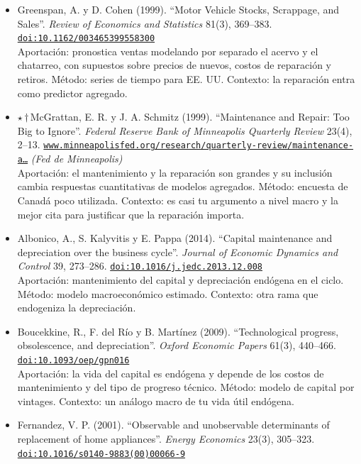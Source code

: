 \documentclass[11pt]{article}
\begin{document}
\begin{itemize}
Aportación: determinantes del chatarreo de autos. Método: series de tiempo agregadas. Contexto: precursor de Parks (1977); suele incluir el costo de reparación entre los determinantes, pero no pude confirmarlo en la fuente.
\item Greenspan, A. y D. Cohen (1999). ``Motor Vehicle Stocks, Scrappage, and Sales''. \textit{Review of Economics and Statistics} 81(3), 369--383. \href{https://doi.org/10.1162/003465399558300}{\texttt{doi:10.1162/003465399558300}}\\
Aportación: pronostica ventas modelando por separado el acervo y el chatarreo, con supuestos sobre precios de nuevos, costos de reparación y retiros. Método: series de tiempo para EE. UU. Contexto: la reparación entra como predictor agregado.
\item $\star$\,$\dagger$\,McGrattan, E. R. y J. A. Schmitz (1999). ``Maintenance and Repair: Too Big to Ignore''. \textit{Federal Reserve Bank of Minneapolis Quarterly Review} 23(4), 2--13. \href{https://www.minneapolisfed.org/research/quarterly-review/maintenance-and-repair-too-big-to-ignore}{\texttt{www.minneapolisfed.org/research/quarterly-review/maintenance-a…}} \textit{(Fed de Minneapolis)}\\
Aportación: el mantenimiento y la reparación son grandes y su inclusión cambia respuestas cuantitativas de modelos agregados. Método: encuesta de Canadá poco utilizada. Contexto: es casi tu argumento a nivel macro y la mejor cita para justificar que la reparación importa.
\item Albonico, A., S. Kalyvitis y E. Pappa (2014). ``Capital maintenance and depreciation over the business cycle''. \textit{Journal of Economic Dynamics and Control} 39, 273--286. \href{https://doi.org/10.1016/j.jedc.2013.12.008}{\texttt{doi:10.1016/j.jedc.2013.12.008}}\\
Aportación: mantenimiento del capital y depreciación endógena en el ciclo. Método: modelo macroeconómico estimado. Contexto: otra rama que endogeniza la depreciación.
\item Boucekkine, R., F. del Río y B. Martínez (2009). ``Technological progress, obsolescence, and depreciation''. \textit{Oxford Economic Papers} 61(3), 440--466. \href{https://doi.org/10.1093/oep/gpn016}{\texttt{doi:10.1093/oep/gpn016}}\\
Aportación: la vida del capital es endógena y depende de los costos de mantenimiento y del tipo de progreso técnico. Método: modelo de capital por vintages. Contexto: un análogo macro de tu vida útil endógena.
\item Fernandez, V. P. (2001). ``Observable and unobservable determinants of replacement of home appliances''. \textit{Energy Economics} 23(3), 305--323. \href{https://doi.org/10.1016/s0140-9883(00)00066-9}{\texttt{doi:10.1016/s0140-9883(00)00066-9}}\\

\end{itemize}
\end{document}
